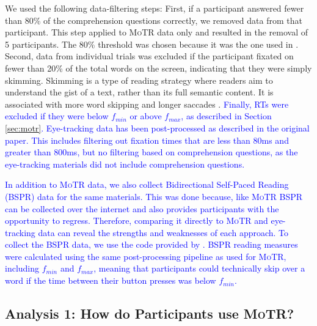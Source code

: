 \documentclass[12pt]{article}
\newcommand{\motr}{\textsc{MoTR}\xspace}
\newcommand{\change}[1]{\textcolor{blue}{#1}}
\begin{document}
{We used the following data-filtering steps: First, if a participant answered fewer than 80\% of the comprehension questions correctly, we removed data from that participant. This step applied to \motr data only and resulted in the removal of 5 participants. The 80\% threshold was chosen because it was the one used in \citet{boyce2020amaze}. Second, data from individual trials was excluded if the participant fixated on fewer than 20\% of the total words on the screen, indicating that they were simply skimming. Skimming is a type of reading strategy where readers aim to understand the gist of a text, rather than its full semantic content. It is associated with more word skipping and longer saccades \citep{liao2021using}. \change{Finally, RTs were excluded if they were below $f_{min}$ or above $f_{max}$, as described in Section \ref{sec:motr}. Eye-tracking data has been post-processed as described in the original paper. This includes filtering out fixation times that are less than $80$ms and greater than $800$ms, but no filtering based on comprehension questions, as the eye-tracking materials did not include comprehension questions.}

\change{In addition to \motr data, we also collect Bidirectional Self-Paced Reading (BSPR) data for the same materials. This was done because, like \motr BSPR can be collected over the internet and also provides participants with the opportunity to regress. Therefore, comparing it directly to \motr and eye-tracking data can reveal the strengths and weaknesses of each approach. To collect the BSPR data, we use the code provided by \citet{paape2021conscious}. BSPR reading measures were calculated using the same post-processing pipeline as used for \motr, including $f_{min}$ and $f_{max}$, meaning that participants could technically skip over a word if the time between their button presses was below $f_{min}$.}



\subsection{Analysis 1: How do Participants use \motr? } \label{sec:basic-usage}

}
\end{document}
